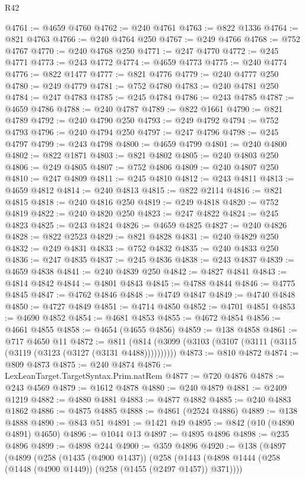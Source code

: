 \begin{lexlean}{R42}
\begin{coremodule}
{@4761 := @4659 @4760
@4762 := @240 @4761
@4763 := @822 @1336
@4764 := @821 @4763
@4766 := @240 @4764 @250
@4767 := @249 @4766
@4768 := @752 @4767
@4770 := @240 @4768 @250
@4771 := @247 @4770
@4772 := @245 @4771
@4773 := @243 @4772
@4774 := @4659 @4773
@4775 := @240 @4774
@4776 := @822 @1477
@4777 := @821 @4776
@4779 := @240 @4777 @250
@4780 := @249 @4779
@4781 := @752 @4780
@4783 := @240 @4781 @250
@4784 := @247 @4783
@4785 := @245 @4784
@4786 := @243 @4785
@4787 := @4659 @4786
@4788 := @240 @4787
@4789 := @822 @1661
@4790 := @821 @4789
@4792 := @240 @4790 @250
@4793 := @249 @4792
@4794 := @752 @4793
@4796 := @240 @4794 @250
@4797 := @247 @4796
@4798 := @245 @4797
@4799 := @243 @4798
@4800 := @4659 @4799
@4801 := @240 @4800
@4802 := @822 @1871
@4803 := @821 @4802
@4805 := @240 @4803 @250
@4806 := @249 @4805
@4807 := @752 @4806
@4809 := @240 @4807 @250
@4810 := @247 @4809
@4811 := @245 @4810
@4812 := @243 @4811
@4813 := @4659 @4812
@4814 := @240 @4813
@4815 := @822 @2114
@4816 := @821 @4815
@4818 := @240 @4816 @250
@4819 := @249 @4818
@4820 := @752 @4819
@4822 := @240 @4820 @250
@4823 := @247 @4822
@4824 := @245 @4823
@4825 := @243 @4824
@4826 := @4659 @4825
@4827 := @240 @4826
@4828 := @822 @2523
@4829 := @821 @4828
@4831 := @240 @4829 @250
@4832 := @249 @4831
@4833 := @752 @4832
@4835 := @240 @4833 @250
@4836 := @247 @4835
@4837 := @245 @4836
@4838 := @243 @4837
@4839 := @4659 @4838
@4841 := @240 @4839 @250
@4842 := @4827 @4841
@4843 := @4814 @4842
@4844 := @4801 @4843
@4845 := @4788 @4844
@4846 := @4775 @4845
@4847 := @4762 @4846
@4848 := @4749 @4847
@4849 := @4740 @4848
@4850 := @4727 @4849
@4851 := @4714 @4850
@4852 := @4701 @4851
@4853 := @4690 @4852
@4854 := @4681 @4853
@4855 := @4672 @4854
@4856 := @4661 @4855
@4858 := @4654 (@4655 @4856)
@4859 := @138 @4858
@4861 := @717 @4650 @11
@4872 := @811 (@814 (@3099 (@3103 (@3107 (@3111 (@3115 (@3119 (@3123 (@3127 (@3131 @4488))))))))))
@4873 := @810 @4872
@4874 := @809 @4873
@4875 := @240 @4874
@4876 := LexLeanTarget.TargetSyntax.Prim.natRem
@4877 := @720 @4876
@4878 := @243 @4569
@4879 := @1612 @4878
@4880 := @240 @4879
@4881 := @2409 @1219
@4882 := @4880 @4881
@4883 := @4877 @4882
@4885 := @240 @4883 @1862
@4886 := @4875 @4885
@4888 := @4861 (@2524 @4886)
@4889 := @138 @4888
@4890 := @843 @51
@4891 := @1421 @49
@4895 := @842 (@10 (@4890 @4891) @4650)
@4896 := @1044 @13
@4897 := @4895 @4896
@4898 := @235 @4896
@4899 := @4898 @244
@4900 := @359 @4896
@4920 := @138
    (@4897
      (@4899
        (@258
          (@1435 (@4900 @1437))
          (@258
            (@1443 (@4898 @1444 (@258 (@1448 (@4900 @1449)) (@258 (@1455 (@2497 @1457)) @371))))
}
\end{coremodule}
\end{lexlean}
